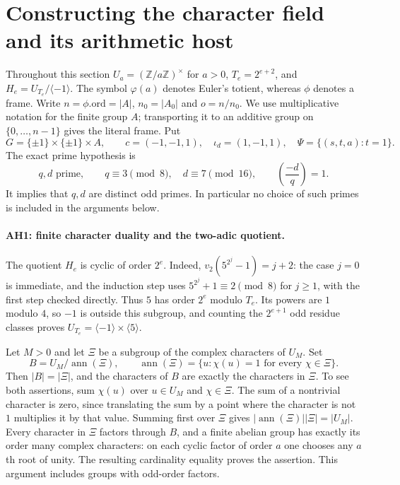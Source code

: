 \section{Constructing the character field and its arithmetic host}
\label{sec:arithmetic-hosts}


Throughout this section $U_a=(\mathbb Z/a\mathbb Z)^\times$ for $a>0$,
$T_e=2^{e+2}$, and $H_e=U_{T_e}/\langle-1\rangle$.
The symbol $\varphi(a)$ denotes Euler's totient, whereas $\phi$ denotes a
frame. Write $n=\phi.\mathrm{ord}=|A|$, $n_0=|A_0|$ and
$o=n/n_0$. We use multiplicative notation for the finite group $A$;
transporting it to an additive group on $\{0,\ldots,n-1\}$ gives the
literal frame. Put
\[
 G=\{\pm1\}\times\{\pm1\}\times A,\qquad
 c=(-1,-1,1),\quad \iota_d=(1,-1,1),\quad
 \Psi=\{(s,t,a):t=1\}.                         \tag{AH.1}
\]
The exact prime hypothesis is
\[
 q,d\text{ prime},\qquad q\equiv3\pmod8,
 \quad d\equiv7\pmod{16},\qquad
 \left(\frac{-d}{q}\right)=1.                 \tag{AH.2}
\]
It implies that $q,d$ are distinct odd primes. In particular no choice of
such primes is included in the arguments below.

\paragraph{AH1: finite character duality and the two-adic quotient.}
The quotient $H_e$ is cyclic of order $2^e$. Indeed,
$v_2(5^{2^j}-1)=j+2$: the case $j=0$ is immediate, and the induction step
uses $5^{2^j}+1\equiv2\pmod8$ for $j\ge1$, with the first step checked
directly. Thus $5$ has order $2^e$ modulo $T_e$. Its powers are $1$ modulo
$4$, so $-1$ is outside this subgroup, and counting the $2^{e+1}$ odd
residue classes proves $U_{T_e}=\langle-1\rangle\times\langle5\rangle$.

Let $M>0$ and let $\Xi$ be a subgroup of the complex characters of $U_M$.
Set
\[
 B=U_M/\operatorname{ann}(\Xi),\qquad
 \operatorname{ann}(\Xi)=\{u:\chi(u)=1\text{ for every }\chi\in\Xi\}.
                                                               \tag{AH.3}
\]
Then $|B|=|\Xi|$, and the characters of $B$ are exactly the characters in
$\Xi$. To see both assertions, sum $\chi(u)$ over $u\in U_M$ and
$\chi\in\Xi$. The sum of a nontrivial character is zero, since translating
the sum by a point where the character is not $1$ multiplies it by that
value. Summing first over $\Xi$ gives
$|\operatorname{ann}(\Xi)||\Xi|=|U_M|$. Every character in $\Xi$ factors
through $B$, and a finite abelian group has exactly its order many complex
characters: on each cyclic factor of order $a$ one chooses any $a$th root
of unity. The resulting cardinality equality proves the assertion.
This argument includes groups with odd-order factors.

